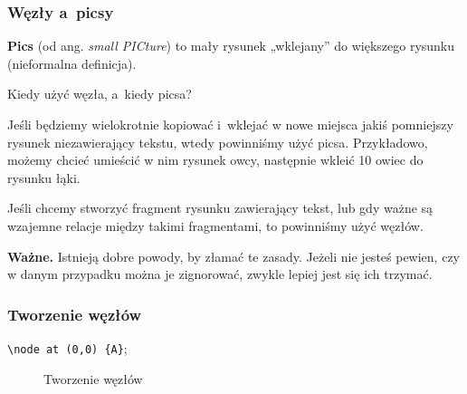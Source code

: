 \documentclass[10pt,t]{beamer}  %
\begin{document}
\begin{frame}
  \frametitle{Węzły a~picsy}

  \textbf{Pics} (od ang. \emph{small PICture}) to mały rysunek
  „wklejany” do większego rysunku (nieformalna definicja).

  Kiedy użyć węzła, a~kiedy picsa?

  Jeśli będziemy wielokrotnie kopiować i~wklejać w nowe miejsca jakiś
  pomniejszy rysunek niezawierający tekstu, wtedy powinniśmy użyć
  picsa. Przykładowo, możemy chcieć umieścić w nim rysunek owcy,
  następnie wkleić 10 owiec do rysunku łąki.

  Jeśli chcemy stworzyć fragment rysunku zawierający tekst, lub gdy
  ważne są wzajemne relacje między takimi fragmentami, to powinniśmy
  użyć węzłów.

  \textbf{Ważne.} Istnieją dobre powody, by złamać te zasady. Jeżeli
  nie jesteś pewien, czy w danym przypadku można je zignorować, zwykle
  lepiej jest się ich trzymać.

\end{frame}





\begin{frame}
  \frametitle{Tworzenie węzłów}


  \texttt{\textbackslash node at (0,0) \{A\}};

  \begin{figure}

    \centering



    \caption{Tworzenie węzłów}

  \end{figure}

\end{frame}
\end{document}
